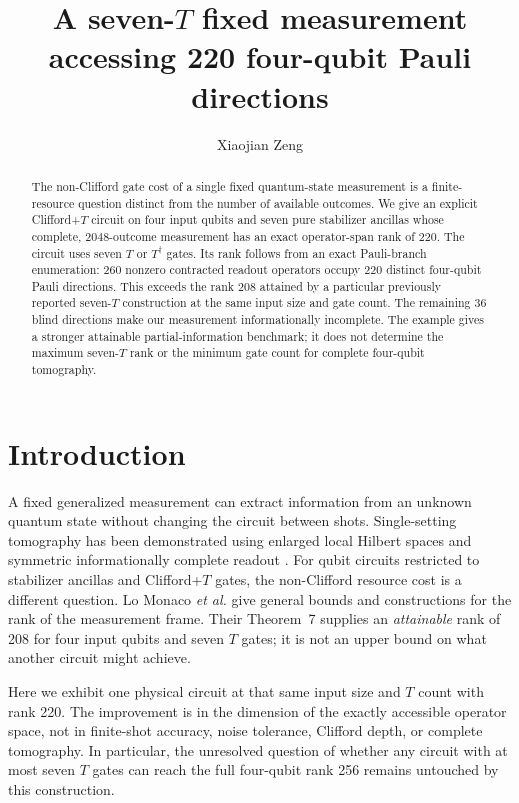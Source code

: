 \documentclass[aps,pra,reprint,floatfix,superscriptaddress,nofootinbib]{revtex4-2}
\begin{document}
\title{A seven-$T$ fixed measurement accessing 220 four-qubit Pauli directions}
\author{Xiaojian Zeng}

\begin{abstract}
The non-Clifford gate cost of a single fixed quantum-state measurement is a finite-resource question distinct from the number of available outcomes. We give an explicit Clifford+$T$ circuit on four input qubits and seven pure stabilizer ancillas whose complete, 2048-outcome measurement has an exact operator-span rank of 220. The circuit uses seven $T$ or $T^\dagger$ gates. Its rank follows from an exact Pauli-branch enumeration: 260 nonzero contracted readout operators occupy 220 distinct four-qubit Pauli directions. This exceeds the rank 208 attained by a particular previously reported seven-$T$ construction at the same input size and gate count. The remaining 36 blind directions make our measurement informationally incomplete. The example gives a stronger attainable partial-information benchmark; it does not determine the maximum seven-$T$ rank or the minimum gate count for complete four-qubit tomography.
\end{abstract}
\maketitle

\section{Introduction}

A fixed generalized measurement can extract information from an unknown quantum state without changing the circuit between shots. Single-setting tomography has been demonstrated using enlarged local Hilbert spaces and symmetric informationally complete readout \cite{Stricker2022}. For qubit circuits restricted to stabilizer ancillas and Clifford+$T$ gates, the non-Clifford resource cost is a different question. Lo Monaco \emph{et al.} \cite{LoMonaco2025} give general bounds and constructions for the rank of the measurement frame. Their Theorem~7 supplies an \emph{attainable} rank of 208 for four input qubits and seven $T$ gates; it is not an upper bound on what another circuit might achieve.

Here we exhibit one physical circuit at that same input size and $T$ count with rank 220. The improvement is in the dimension of the exactly accessible operator space, not in finite-shot accuracy, noise tolerance, Clifford depth, or complete tomography. In particular, the unresolved question of whether any circuit with at most seven $T$ gates can reach the full four-qubit rank 256 remains untouched by this construction.
\end{document}
